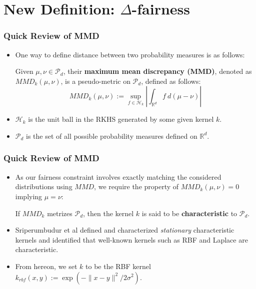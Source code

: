 \documentclass{beamer}
\begin{document}
\section{New Definition: $\Delta$-fairness}

\begin{frame}
	\frametitle{Quick Review of MMD}
	\begin{itemize}
		\item One way to define distance between two probability measures is as follows:	\begin{definition}
			Given $\mu, \nu \in \mathcal{P}_d$, their {\bf maximum mean discrepancy (MMD)}, denoted as $MMD_k(\mu, \nu)$, is a pseudo-metric on $\mathcal{P}_d$, defined as follows:
			\begin{equation*}
				MMD_k(\mu, \nu) := \sup_{f \in \mathcal{H}_k} \left| \int_{\mathbb{R}^d} f \ d(\mu - \nu) \right|
			\end{equation*}
		\end{definition}
		
		\item $\mathcal{H}_k$ is the unit ball in the RKHS generated by some given kernel $k$.
		
		\item $\mathcal{P}_d$ is the set of all possible probability measures defined on $\mathbb{R}^d$.
	\end{itemize}
\end{frame}

\begin{frame}
	\frametitle{Quick Review of MMD}
	\begin{itemize}
		\item As our fairness constraint involves exactly matching the
		considered distributions using $MMD$, we require the property
		of $MMD_k(\mu, \nu) = 0$ implying $\mu = \nu$:
		\begin{definition}
			If $MMD_k$ metrizes $\mathcal{P}_d$, then the kernel $k$ is said to be {\bf characteristic} to $\mathcal{P}_d$.
		\end{definition}
		
		\item Sriperumbudur et al \cite{Sriperumbudur08} defined and characterized {\it stationary} characteristic kernels and identified that well-known kernels such as RBF and Laplace are characteristic.
		
		\item From hereon, we set $k$ to be the RBF kernel $k_{rbf}(x, y) := \exp(-\lVert x - y \rVert^2 / 2\sigma^2)$.
	\end{itemize}
\end{frame}
\end{document}
